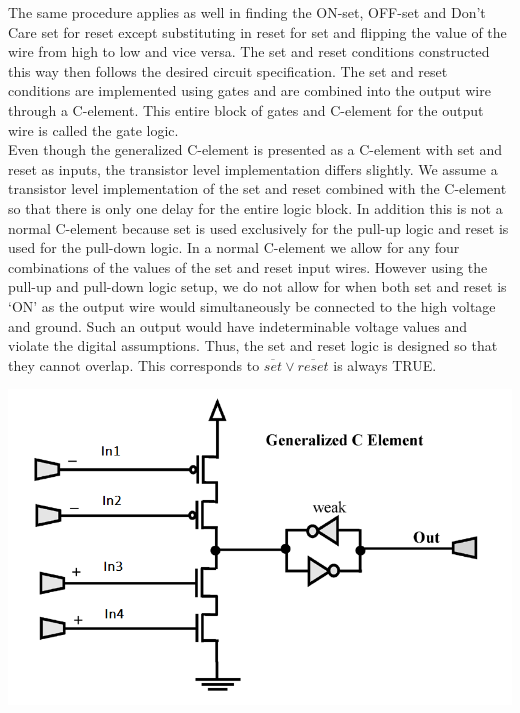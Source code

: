 \documentclass[12pt]{report}
\begin{document}
The same procedure applies as well in finding the ON-set, OFF-set and Don't Care set for reset except substituting in reset for set and flipping the value of the wire from high to low and vice versa. The set and reset conditions constructed this way then follows the desired circuit specification.  The set and reset conditions are implemented using gates and are combined into the output wire through a C-element.  This entire block of gates and C-element for the output wire is called the gate logic. \\   %

Even though the generalized C-element is presented as a C-element with set and reset as inputs, the transistor level implementation differs slightly.  We assume a transistor level implementation of the set and reset combined with the C-element so that there is only one delay for the entire logic block.  In addition this is not a normal C-element because set is used exclusively for the pull-up logic and reset is used for the pull-down logic.  In a normal C-element we allow for any four combinations of the values of the set and reset input wires.  However using the pull-up and pull-down logic setup, we do not allow for when both set and reset is `ON' as the output wire would simultaneously be connected to the high voltage and ground.  Such an output would have indeterminable voltage values and violate the digital assumptions.  Thus, the set and reset logic is designed so that they cannot overlap.  This corresponds to $\overline{set}\vee\overline{reset} $ is always TRUE.\\
\begin{center}
\includegraphics[width=.7\textwidth]{genC}
\end{center}
\end{document}

